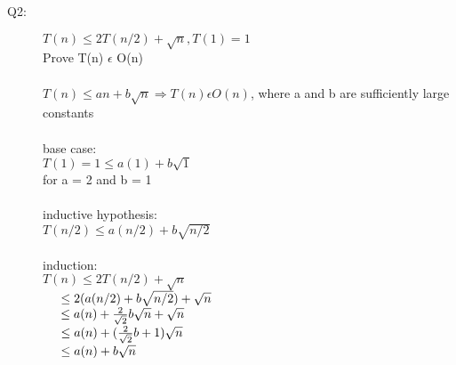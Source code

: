 \documentclass{article}
\begin{document}
\begin{description}
\vspace{5mm}
\item[Q2:] 
\begin{itemize}
$T(n) \leq 2T(n/2) + \sqrt{n}, T(1)=1$\\
Prove T(n) $\epsilon$ O(n)\\
\\
$T(n)\leq an+b\sqrt{n}\Rightarrow T(n) \epsilon O(n)$, where a and b are sufficiently large constants\\
\\
base case:\\
$T(1) = 1 \leq a(1)+b\sqrt{1}$\\
for a = 2 and b = 1\\
\\
inductive hypothesis:\\
$T(n/2) \leq a(n/2) + b \sqrt{n/2}$\\
\\
induction:\\
$T(n) \leq 2T(n/2) + \sqrt{n}$\\
$\hspace*{5mm}\leq 2(a(n/2) + b \sqrt{n/2}) + \sqrt{n}$\\
$\hspace*{5mm}\leq a(n) + \frac{2}{\sqrt{2}}b \sqrt{n} + \sqrt{n}$\\
$\hspace*{5mm}\leq a(n) + (\frac{2}{\sqrt{2}}b + 1) \sqrt{n}$\\
$\hspace*{5mm}\leq a(n) + b\sqrt{n}$\\
\end{itemize}
\vspace{5mm}


\end{description}
\end{document}
